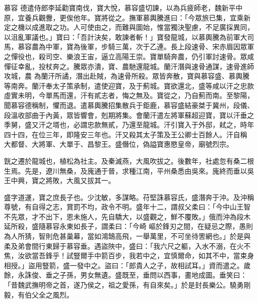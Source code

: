 \begin{pinyinscope}
 慕容
 德遣侍郎李延勸寶南伐，寶大悅，慕容盛切諫，以為兵疲師老，魏新平中原，宜養兵觀釁，更俟他年。寶將從之。撫軍慕輿騰進曰：「今眾旅已集，宜乘新定之機以成進取之功。人可使由之，而難與圖始，惟當獨決聖慮，不足廣採異同，以沮亂軍議也。」寶曰：「吾計決矣，敢諫者斬！」寶發龍城，以慕輿騰為前軍大司馬，慕容農為中軍，寶為後軍，步騎三萬，次于乙連。長上段速骨、宋赤眉因眾軍之憚役也，殺司空、樂浪王宙，逼立高陽王崇。寶單騎奔農，仍引軍討速骨。眾咸憚征幸亂，投杖奔之。騰眾亦潰，寶、農馳還龍城。蘭汗潛與速骨通謀，速骨進師攻城，農
 為蘭汗所譎，潛出赴賊，為速骨所殺。眾皆奔散，寶與慕容盛、慕輿騰等南奔。蘭汗奉太子策承制，遣使迎寶，及于薊城。寶欲還北，盛等咸以汗之忠款虛實未明，今單馬而還，汗有貳志者，悔之無及。寶從之，乃自薊而南。至黎陽，聞慕容德稱制，懼而退。遣慕輿騰招集散兵于鉅鹿，慕容盛結豪桀于冀州，段儀、段溫收部曲于內黃，眾皆響會，剋期將集。會蘭汗遣左將軍蘇超迎寶，寶以汗垂之季舅，盛又汗之壻也，必謂忠款無貳，乃還至龍城。汗引寶入于外邸，弒之，時年四十四，在位三年，即隆安三年也。汗又殺其太子策及王公卿士百餘人。汗自稱
 大都督、大將軍、大單于、昌黎王。盛僭位，偽謚寶惠愍皇帝，廟號烈宗。



 皝之遷於龍城也，植松為社主。及秦滅燕，大風吹拔之。後數年，社處忽有桑二根生焉。先是，遼川無桑，及廆通于晉，求種江南，平州桑悉由吳來。廆終而垂以吳王中興，寶之將敗，大風又拔其一。



 盛字道運，寶之庶長子也。少沈敏，多謀略。苻堅誅慕容氏，盛潛奔于沖。及沖稱尊號，有自得之志，賞罰不均，政令不明。盛年十二，謂叔父柔曰：「今中山王智不先眾，才不出下，恩未施人，先自驕大，以盛觀之，鮮不覆敗。」俄而沖為段木延所殺，盛隨慕容永東如長子，謂柔曰：「今崎
 嶇於鋒刃之間，在疑忌之際，愚則為人所猜，智則危甚巢幕，當如鴻鵠高飛，一舉萬里，不可坐待罟網也。」於是與柔及弟會間行東歸于慕容垂。遇盜陜中，盛曰：「我六尺之軀，入水不溺，在火不焦，汝欲當吾鋒乎！試豎爾手中箭百步，我若中之，宜慎爾命，如其不中，當束身相授。」盜用豎箭，盛一發中之。盜曰：「郎貴人之子，故相試耳。」資而遣之。歲餘，永誅俊、垂之子孫，男女無遺。盛既至，垂問以西事，畫地成圖。垂笑曰：「昔魏武撫明帝之首，遂乃侯之，祖之愛孫，有自來矣。」於是封長樂公。驍勇剛毅，有伯父全之風烈。




\end{pinyinscope}
